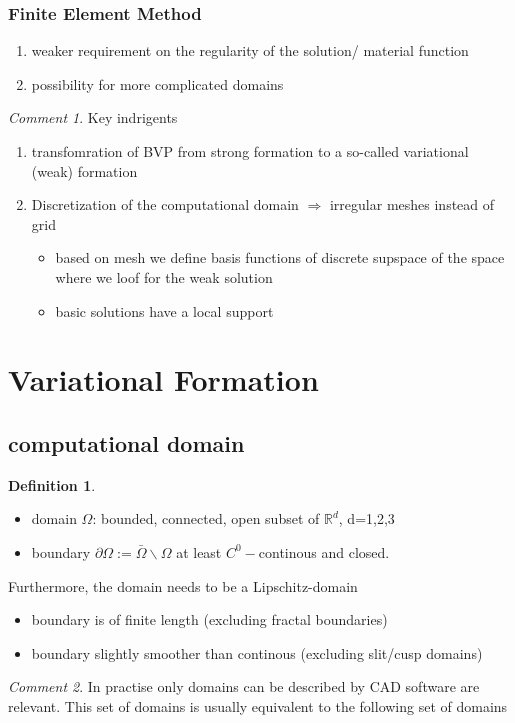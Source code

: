 \documentclass[ngerman]{article}
\theoremstyle{definition}
\newtheorem*{defi}{Definition}
\theoremstyle{remark}
\newtheorem*{comm}{Comment}
\newcommand{\p}{\partial}
\newcommand{\RR}{\mathbb{R}}			%
\newcommand{\OO}{\Omega}
\newcommand{\drw}{\Rightarrow}			%
\begin{document}
\subsubsection{Finite Element Method}
\begin{enumerate}
\item weaker requirement on the regularity of the solution/ material function
\item possibility for more complicated domains
\end{enumerate}
\begin{comm}
  Key indrigents
  \begin{enumerate}
  \item transfomration of BVP from strong formation to a so-called variational (weak) formation
  \item Discretization of the computational domain $\drw$ irregular meshes instead of grid
    \begin{itemize}
    \item based on mesh we define basis functions of discrete supspace of the space where we loof for the weak solution
    \item basic solutions have a local support
    \end{itemize}
  \end{enumerate}
\end{comm}
\section{Variational Formation}
\subsection{computational domain}
\begin{defi}
  \begin{itemize}
  \item domain $\OO$: bounded, connected, open subset of $\RR^d$, d=1,2,3
  \item boundary $\p\OO:=\bar\OO \backslash \OO$ at least $C^0-$continous and closed.
  \end{itemize}
  Furthermore, the domain needs to be a Lipschitz-domain
  \begin{itemize}
  \item boundary is of finite length (excluding fractal boundaries)
  \item boundary slightly smoother than continous (excluding slit/cusp domains)
  \end{itemize}
\end{defi}
\begin{comm}
  In practise only domains can be described by CAD software are relevant. This set of domains is usually equivalent to the following set of domains\end{comm}
\end{document}
